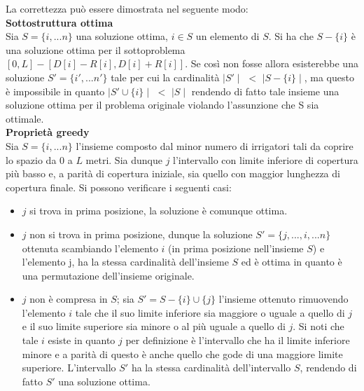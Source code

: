 \documentclass[../cheatSheetAlgoritmi.tex]{subfiles}
\begin{document}
La correttezza può essere dimostrata nel seguente modo: \\
\textbf{Sottostruttura ottima} \\
Sia $S = \{i, ... n\}$ una soluzione ottima, $i \in S$ un elemento di $S$. Si ha che $S - \{i\}$ è una soluzione ottima per il sottoproblema $[0, L] - [D[i] - R[i], D[i] + R[i]]$. Se così non fosse allora esisterebbe una soluzione $S' = \{i', ... n'\}$ tale per cui la cardinalità $\mid S' \mid$ $<$ $\mid S - \{i\} \mid$, ma questo è impossibile in quanto $\mid S' \cup \{i\} \mid$ $<$ $\mid S \mid$ rendendo di fatto tale insieme una soluzione ottima per il problema originale violando l'assunzione che S sia ottimale.\\
\textbf{Proprietà greedy} \\
Sia $S = \{i, ... n\}$ l'insieme composto dal minor numero di irrigatori tali da coprire lo spazio da 0 a $L$ metri. Sia dunque $j$ l'intervallo con limite inferiore di copertura più basso e, a parità di copertura iniziale, sia quello con maggior lunghezza di copertura finale. Si possono verificare i seguenti casi:
\begin{itemize}
    \item $j$ si trova in prima posizione, la soluzione è comunque ottima.
    \item $j$ non si trova in prima posizione, dunque la soluzione $S' = \{j, ..., i, ... n\}$ ottenuta scambiando l'elemento $i$ (in prima posizione nell'insieme $S$) e l'elemento j, ha la stessa cardinalità dell'insieme $S$ ed è ottima in quanto è una permutazione dell'insieme originale.
    \item $j$ non è compresa in $S$; sia $S' = S - \{i\} \cup \{j\}$ l'insieme ottenuto rimuovendo l'elemento $i$ tale che il suo limite inferiore sia maggiore o uguale a quello di $j$ e il suo limite superiore sia minore o al più uguale a quello di $j$. Si noti che tale $i$ esiste in quanto $j$ per definizione è l'intervallo che ha il limite inferiore minore e a parità di questo è anche quello che gode di una maggiore limite superiore. L'intervallo $S'$ ha la stessa cardinalità dell'intervallo $S$, rendendo di fatto $S'$ una soluzione ottima.
\end{itemize}
\newpage
\end{document}
